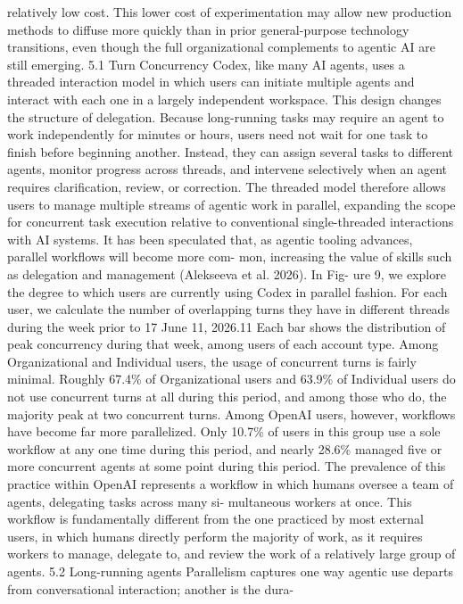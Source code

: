 relatively low cost. This lower cost of experimentation may allow new production methods to diffuse
more quickly than in prior general-purpose technology transitions, even though the full organizational
complements to agentic AI are still emerging.
5.1
Turn Concurrency
Codex, like many AI agents, uses a threaded interaction model in which users can initiate multiple
agents and interact with each one in a largely independent workspace. This design changes the structure
of delegation. Because long-running tasks may require an agent to work independently for minutes or
hours, users need not wait for one task to finish before beginning another. Instead, they can assign
several tasks to different agents, monitor progress across threads, and intervene selectively when an
agent requires clarification, review, or correction. The threaded model therefore allows users to manage
multiple streams of agentic work in parallel, expanding the scope for concurrent task execution relative
to conventional single-threaded interactions with AI systems.
It has been speculated that, as agentic tooling advances, parallel workflows will become more com-
mon, increasing the value of skills such as delegation and management (Alekseeva et al. 2026). In Fig-
ure 9, we explore the degree to which users are currently using Codex in parallel fashion. For each user,
we calculate the number of overlapping turns they have in different threads during the week prior to
17
June 11, 2026.11 Each bar shows the distribution of peak concurrency during that week, among users of
each account type. Among Organizational and Individual users, the usage of concurrent turns is fairly
minimal. Roughly 67.4\% of Organizational users and 63.9\% of Individual users do not use concurrent
turns at all during this period, and among those who do, the majority peak at two concurrent turns.
Among OpenAI users, however, workflows have become far more parallelized. Only 10.7\% of users in
this group use a sole workflow at any one time during this period, and nearly 28.6\% managed five or
more concurrent agents at some point during this period. The prevalence of this practice within OpenAI
represents a workflow in which humans oversee a team of agents, delegating tasks across many si-
multaneous workers at once. This workflow is fundamentally different from the one practiced by most
external users, in which humans directly perform the majority of work, as it requires workers to manage,
delegate to, and review the work of a relatively large group of agents.
5.2
Long-running agents
Parallelism captures one way agentic use departs from conversational interaction; another is the dura-
